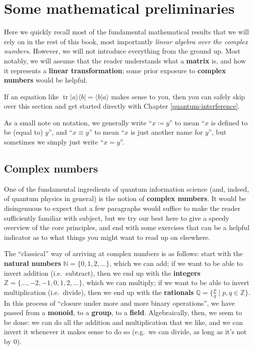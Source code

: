 \documentclass[fleqn]{article}
\let\oldsection\section
\renewcommand\section{\clearpage\oldsection}
\begin{document}
\hypertarget{some-mathematical-preliminaries}{%
\section*{Some mathematical preliminaries}\label{some-mathematical-preliminaries}}

Here we quickly recall most of the fundamental mathematical results that we will rely on in the rest of this book, most importantly \emph{linear algebra over the complex numbers}.
However, we will not introduce everything from the ground up.
Most notably, we will assume that the reader understands what a \textbf{matrix} is, and how it represents a \textbf{linear transformation}; some prior exposure to \textbf{complex numbers} would be helpful.

If an equation like \(\operatorname{tr}|a\rangle\langle b|=\langle b|a\rangle\) makes sense to you, then you can safely skip over this section and get started directly with Chapter \ref{quantum-interference}.

As a small note on notation, we generally write ``\(x\coloneqq y\)'' to mean ``\(x\) is defined to be (equal to) \(y\)'', and ``\(x\equiv y\)'' to mean ``\(x\) is just another name for \(y\)'', but sometimes we simply just write ``\(x=y\)''.

\hypertarget{complex-numbers}{%
\subsection{Complex numbers}\label{complex-numbers}}

One of the fundamental ingredients of quantum information science (and, indeed, of quantum physics in general) is the notion of \textbf{complex numbers}.
It would be disingenuous to expect that a few paragraphs would suffice to make the reader sufficiently familiar with subject, but we try our best here to give a speedy overview of the core principles, and end with some exercises that can be a helpful indicator as to what things you might want to read up on elsewhere.

The ``classical'' way of arriving at complex numbers is as follows: start with the \textbf{natural numbers} \(\mathbb{N}=\{0,1,2,\ldots\}\), which we can add; if we want to be able to invert addition (i.e.~subtract), then we end up with the \textbf{integers} \(\mathbb{Z}=\{\ldots,-2,-1,0,1,2,\ldots\}\), which we can multiply; if we want to be able to invert multiplication (i.e.~divide), then we end up with the \textbf{rationals} \(\mathbb{Q}=\{\frac{p}{q}\mid p,q\in\mathbb{Z}\}\).
In this process of ``closure under more and more binary operations'', we have passed from a \textbf{monoid}, to a \textbf{group}, to a \textbf{field}.
Algebraically, then, we seem to be done: we can do all the addition and multiplication that we like, and we can invert it whenever it makes sense to do so (e.g.~we can divide, as long as it's not by \(0\)).
\end{document}
